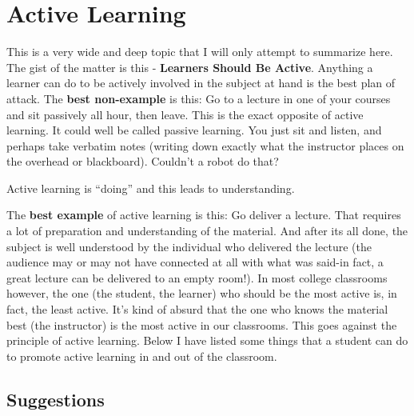 \chapter{Active Learning}

This is a very wide and deep topic that I will only attempt to summarize here. The gist of the matter is this - \textbf{Learners Should Be Active}. Anything a learner can do to be actively involved in the subject at hand is the best plan of attack. The \textbf{best non-example} is this: Go to a lecture in one of your courses and sit passively all hour, then leave. This is the exact opposite of active learning. It could well be called passive learning. You just sit and listen, and perhaps take verbatim notes (writing down exactly what the instructor places on the overhead or blackboard). Couldn't a robot do that?



Active learning is ``doing'' and this leads to understanding.

The \textbf{best example} of active learning is this: Go deliver a lecture. That requires a lot of preparation and understanding of the material. And after its all done, the subject is well understood by the individual who delivered the lecture (the audience may or may not have connected at all with what was said-in fact, a great lecture can be delivered to an empty room!). In most college classrooms however, the one (the student, the learner) who should be the most active is, in fact, the least active. It's kind of absurd that the one who knows the material best (the instructor) is the most active in our classrooms. This goes against the principle of active learning. Below I have listed some things that a student can do to promote active learning in and out of the classroom.


\section{Suggestions}


